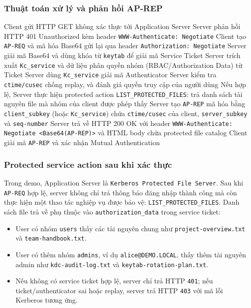 \documentclass[12pt]{article}
\begin{document}
\subsubsection{Thuật toán xử lý và phản hồi AP-REP}
\begin{algorithm}[H]
\caption{Xử lý AP Exchange qua HTTP Negotiate}
\begin{algorithmic}[1]
\State Client gửi HTTP GET không xác thực tới Application Server
\State Server phản hồi HTTP 401 Unauthorized kèm header \texttt{WWW-Authenticate: Negotiate}
\State Client tạo \texttt{AP-REQ} và mã hóa Base64 gửi lại qua header \texttt{Authorization: Negotiate}
\State Server giải mã Base64 và dùng khóa từ \texttt{keytab} để giải mã Service Ticket
\State Server trích xuất \texttt{Kc\_service} và dữ liệu phân quyền nhóm (RBAC/Authorization Data) từ Ticket
\State Server dùng \texttt{Kc\_service} giải mã Authenticator
\State Server kiểm tra \texttt{ctime/cusec} chống replay, và đánh giá quyền truy cập của người dùng
\State Nếu hợp lệ, Server thực hiện protected action \texttt{LIST\_PROTECTED\_FILES}: trả danh sách tài nguyên file mà nhóm của client được phép thấy
\State Server tạo \texttt{AP-REP} mã hóa bằng \texttt{client\_subkey} (hoặc \texttt{Kc\_service}) chứa \texttt{ctime/cusec} của client, \texttt{server\_subkey} và \texttt{seq-number}
\State Server trả về HTTP 200 OK với header \texttt{WWW-Authenticate: Negotiate <Base64(AP-REP)>} và HTML body chứa protected file catalog
\State Client giải mã \texttt{AP-REP} và xác nhận Mutual Authentication
\end{algorithmic}
\end{algorithm}

\subsubsection{Protected service action sau khi xác thực}

Trong demo, Application Server là \texttt{Kerberos Protected File Server}. Sau khi \texttt{AP-REQ} hợp lệ, server không chỉ trả thông báo đăng nhập thành công mà còn thực hiện một thao tác nghiệp vụ được bảo vệ: \texttt{LIST\_PROTECTED\_FILES}. Danh sách file trả về phụ thuộc vào \texttt{authorization\_data} trong service ticket:

\begin{itemize}
    \item User có nhóm \texttt{users} thấy các tài nguyên chung như \texttt{project-overview.txt} và \texttt{team-handbook.txt}.
    \item User có thêm nhóm \texttt{admins}, ví dụ \texttt{alice@DEMO.LOCAL}, thấy thêm tài nguyên admin như \texttt{kdc-audit-log.txt} và \texttt{keytab-rotation-plan.txt}.
    \item Nếu không có service ticket hợp lệ, server chỉ trả HTTP \texttt{401}; nếu ticket/authenticator sai hoặc replay, server trả HTTP \texttt{403} với mã lỗi Kerberos tương ứng.
\end{itemize}
\end{document}

